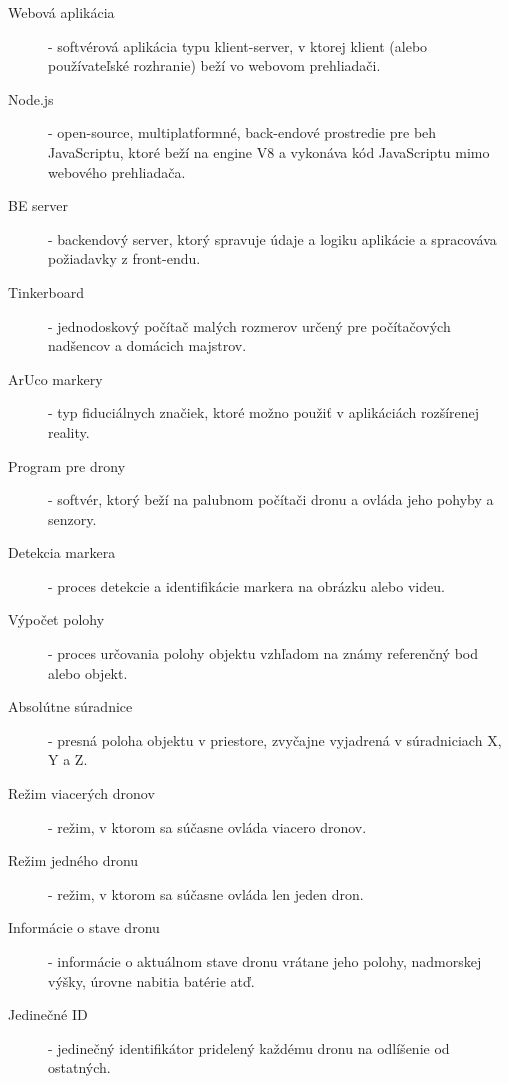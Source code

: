 \documentclass[]{tukediphc}
\begin{document}
\begin{description}
	\item[Webová aplikácia] - softvérová aplikácia typu klient-server, v ktorej klient (alebo používateľské rozhranie) beží vo webovom prehliadači.
	\item[Node.js] - open-source, multiplatformné, back-endové prostredie pre beh JavaScriptu, ktoré beží na engine V8 a vykonáva kód JavaScriptu mimo webového prehliadača.	
	\item[BE server] - backendový server, ktorý spravuje údaje a logiku aplikácie a spracováva požiadavky z front-endu.	
	\item[Tinkerboard] - jednodoskový počítač malých rozmerov určený pre počítačových nadšencov a domácich majstrov.	
	\item[ArUco markery] - typ fiduciálnych značiek, ktoré možno použiť v aplikáciách rozšírenej reality.	
	\item[Program pre drony] - softvér, ktorý beží na palubnom počítači dronu a ovláda jeho pohyby a senzory.
	\item[Detekcia markera] - proces detekcie a identifikácie markera na obrázku alebo videu.	
	\item[Výpočet polohy] - proces určovania polohy objektu vzhľadom na známy referenčný bod alebo objekt.	
	\item[Absolútne súradnice] - presná poloha objektu v priestore, zvyčajne vyjadrená v súradniciach X, Y a Z.	
	\item[Režim viacerých dronov] - režim, v ktorom sa súčasne ovláda viacero dronov.	
	\item[Režim jedného dronu] - režim, v ktorom sa súčasne ovláda len jeden dron.	
	\item[Informácie o stave dronu] - informácie o aktuálnom stave dronu vrátane jeho polohy, nadmorskej výšky, úrovne nabitia batérie atď.
	\item[Jedinečné ID] - jedinečný identifikátor pridelený každému dronu na odlíšenie od ostatných.
\end{description}

\kslovnikterminov
%

%

%

%

%   

%

%

%

%
 


% 
%
% 
% 
% 
% 
%
\newpage
{}
\protect\label{page:posledna}
\end{document}
